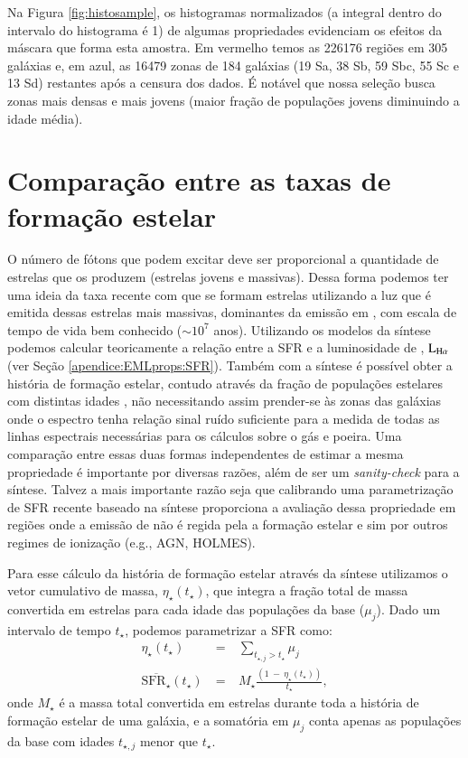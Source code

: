 Na Figura \ref{fig:histosample}, os histogramas normalizados (a integral dentro do intervalo do histograma é 1) de algumas propriedades evidenciam os efeitos da máscara que forma esta amostra. Em vermelho temos as 226176 regiões em 305 galáxias e, em azul, as 16479 zonas de 184 galáxias (19 Sa, 38 Sb, 59 Sbc, 55 Sc e 13 Sd) restantes após a censura dos dados. É notável que nossa seleção busca zonas mais densas e mais jovens (maior fração de populações jovens diminuindo a idade média).
%


\section{Comparação entre as taxas de formação estelar}
\label{apendice:synvsneb:SFR}

O número de fótons que podem excitar \Ha deve ser proporcional a quantidade de estrelas que os produzem (estrelas jovens e massivas). Dessa forma podemos ter uma ideia da taxa recente com que se formam estrelas utilizando a luz que é emitida dessas estrelas mais massivas, dominantes da emissão em \Ha, com escala de tempo de vida bem conhecido ($\sim 10^7$ anos). Utilizando os modelos da síntese podemos calcular teoricamente a relação entre a SFR e a luminosidade de \Ha, $\LHalpha$ (ver Seção \ref{apendice:EMLprops:SFR}). Também com a síntese é possível obter a história de formação estelar, contudo através da fração de populações estelares com distintas idades \citep{Asari.etal.2007a}, não necessitando assim prender-se às zonas das galáxias onde o espectro tenha relação sinal ruído suficiente para a medida de todas as linhas espectrais necessárias para os cálculos sobre o gás e poeira. Uma comparação entre essas duas formas independentes de estimar a mesma propriedade é importante por diversas razões, além de ser um {\em sanity-check} para a síntese. Talvez a mais importante razão seja que calibrando uma parametrização de SFR recente baseado na síntese proporciona a avaliação dessa propriedade em regiões onde a emissão de \Ha não é regida pela a formação estelar e sim por outros regimes de ionização (e.g., AGN, HOLMES).

Para esse cálculo da história de formação estelar através da síntese utilizamos o vetor cumulativo de massa, $\eta_\star(t_\star)$, que integra a fração total de massa convertida em estrelas para cada idade das populações da base ($\mu_j$). Dado um intervalo de tempo $t_\star$, podemos parametrizar a SFR como:
\begin{eqnarray}
	\eta_\star(t_\star)\ &=&\ \sum\limits_{t_{\star,j} > t_\star} \mu_j \\
	\overline{\mathrm{SFR}_\star}(t_\star)\ &=&\ M_\star \frac{(1\ -\ \eta_\star(t_\star))}{t_\star},
	\label{eq:SFRSyn}
\end{eqnarray}
\noindent onde $M_\star$ é a massa total convertida em estrelas durante toda a história de formação estelar de uma galáxia, e a somatória em $\mu_j$ conta apenas as populações da base com idades $t_{\star,j}$ menor que $t_\star$.

